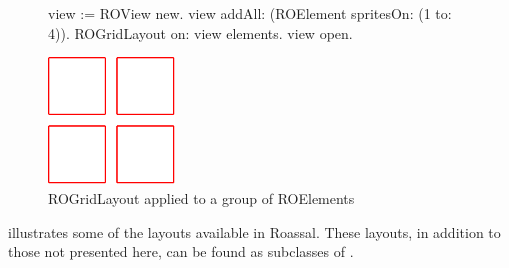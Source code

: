 \documentclass[a4paper,10pt,twoside]{book}
\begin{document}
\begin{figure}[H]

      \begin{minipage}[t]{0.55\textwidth}
      \vspace{0pt}
     \begin{code}{}
view := ROView new.
view addAll: (ROElement spritesOn: (1 to: 4)).
ROGridLayout on: view elements.
view open.
  \end{code}
   \end{minipage}
   \hfill
   \begin{minipage}[t]{0.6\textwidth}
      \vspace{0pt} \raggedright
       \centering
		\includegraphics[width=0.3\textwidth]{ROGrid2} %
   \end{minipage}

\caption{ROGridLayout applied to a group of ROElements}
\label{fig:primerLayout}
\end{figure} 

 illustrates some of the layouts available in Roassal. These layouts, in addition to those not presented here, can be found as subclasses of .
\end{document}
